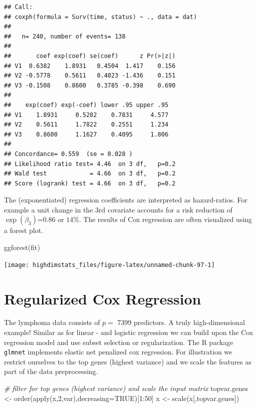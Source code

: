 \documentclass[
]{book}
\newenvironment{Shaded}{\begin{snugshade}}{\end{snugshade}}
\newcommand{\AttributeTok}[1]{\textcolor[rgb]{0.77,0.63,0.00}{#1}}
\newcommand{\CommentTok}[1]{\textcolor[rgb]{0.56,0.35,0.01}{\textit{#1}}}
\newcommand{\ConstantTok}[1]{\textcolor[rgb]{0.00,0.00,0.00}{#1}}
\newcommand{\DecValTok}[1]{\textcolor[rgb]{0.00,0.00,0.81}{#1}}
\newcommand{\FunctionTok}[1]{\textcolor[rgb]{0.00,0.00,0.00}{#1}}
\newcommand{\NormalTok}[1]{#1}
\newcommand{\OtherTok}[1]{\textcolor[rgb]{0.56,0.35,0.01}{#1}}
\newcommand{\SpecialCharTok}[1]{\textcolor[rgb]{0.00,0.00,0.00}{#1}}
\begin{document}
\begin{verbatim}
## Call:
## coxph(formula = Surv(time, status) ~ ., data = dat)
## 
##   n= 240, number of events= 138 
## 
##       coef exp(coef) se(coef)      z Pr(>|z|)
## V1  0.6382    1.8931   0.4504  1.417    0.156
## V2 -0.5778    0.5611   0.4023 -1.436    0.151
## V3 -0.1508    0.8600   0.3785 -0.398    0.690
## 
##    exp(coef) exp(-coef) lower .95 upper .95
## V1    1.8931     0.5282    0.7831     4.577
## V2    0.5611     1.7822    0.2551     1.234
## V3    0.8600     1.1627    0.4095     1.806
## 
## Concordance= 0.559  (se = 0.028 )
## Likelihood ratio test= 4.46  on 3 df,   p=0.2
## Wald test            = 4.66  on 3 df,   p=0.2
## Score (logrank) test = 4.66  on 3 df,   p=0.2
\end{verbatim}

The (exponentiated) regression coefficients are interpreted as hazard-ratios. For example a unit change in the 3rd covariate accounts for a risk reduction of \(\exp(\beta_3)\)=0.86 or \(14\%\). The results of Cox regression are often visualized using a forest plot.

\begin{Shaded}
\begin{Highlighting}[]
\FunctionTok{ggforest}\NormalTok{(fit)}
\end{Highlighting}
\end{Shaded}

\begin{center}\texttt{[image: highdimstats\_files/figure-latex/unnamed-chunk-97-1]} \end{center}

\hypertarget{regularized-cox-regression}{%
\section{Regularized Cox Regression}\label{regularized-cox-regression}}

The lymphoma data consists of \(p=\) 7399 predictors. A truly high-dimensional example! Similar as for linear - and logistic regression we can build upon the Cox regression model and use subset selection or regularization. The R package \texttt{glmnet} implements elastic net penalized cox regression. For illustration we restrict ourselves to the top genes (highest variance) and we scale the features as part of the data preprocessing.

\begin{Shaded}
\begin{Highlighting}[]
\CommentTok{\# filter for top genes (highest variance) and scale the input matrix}
\NormalTok{topvar.genes }\OtherTok{\textless{}{-}} \FunctionTok{order}\NormalTok{(}\FunctionTok{apply}\NormalTok{(x,}\DecValTok{2}\NormalTok{,var),}\AttributeTok{decreasing=}\ConstantTok{TRUE}\NormalTok{)[}\DecValTok{1}\SpecialCharTok{:}\DecValTok{50}\NormalTok{]}
\NormalTok{x }\OtherTok{\textless{}{-}} \FunctionTok{scale}\NormalTok{(x[,topvar.genes])}
\end{Highlighting}
\end{Shaded}
\end{document}

